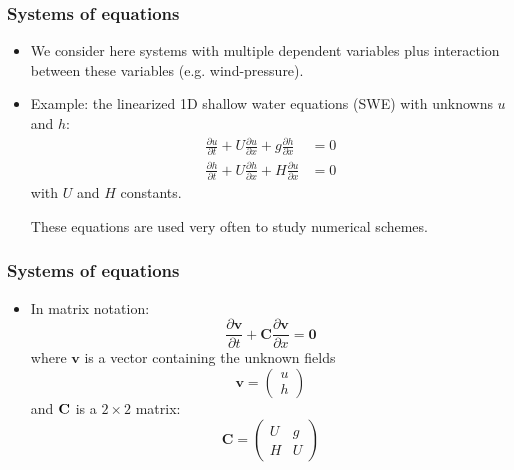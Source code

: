 \documentclass[aspectratio=149,9pt]{beamer}
\begin{document}
\begin{frame}
	\frametitle{Systems of equations}
	\begin{itemize}
		\item We consider here systems with multiple dependent variables plus interaction between these variables (e.g. wind-pressure).\\[4ex]
		\item Example: the linearized 1D shallow water equations (SWE) with unknowns $u$ and $h$:
			\begin{align*}
				\frac{\partial u}{\partial t} + U \frac{\partial u}{\partial x} + g \frac{\partial h}{\partial x} &= 0 \\
				\frac{\partial h}{\partial t} + U \frac{\partial h}{\partial x} + H \frac{\partial u}{\partial x} &= 0
			\end{align*}
			with $U$ and $H$ constants.
			\par\vspace*{2ex}
			These equations are used very often to study numerical schemes.
	\end{itemize}
\end{frame}
%
%
\begin{frame}
	\frametitle{Systems of equations}
	\begin{itemize}
		\item In matrix notation:
			\begin{equation*}
				\frac{\partial \bm v}{\partial t}+\bm C\frac{\partial \bm v}{\partial x}=\bm 0
			\end{equation*}
			where $\bm v$ is a vector containing the unknown fields
			\begin{equation*}
				\bm v=\left(\begin{array}{c}u\\h\end{array}\right)
			\end{equation*}
			and $\bf C$ is a $2\times2$ matrix:
			\begin{equation*}
				\bm C=\left(\begin{array}{cc}U & g\\H &U\end{array}\right)
			\end{equation*}
	\end{itemize}
\end{frame}
%
\end{document}
